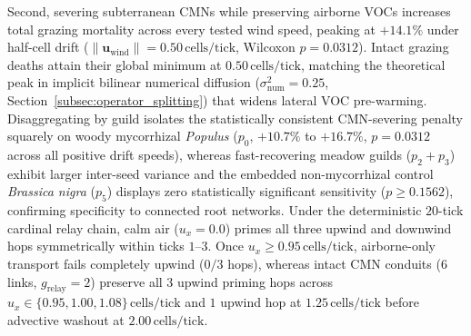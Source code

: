 Second, severing subterranean CMNs while preserving airborne VOCs increases total grazing mortality across every tested wind speed, peaking at $+14.1\%$ under half-cell drift ($\|\mathbf{u}_{\text{wind}}\| = 0.50\,\text{cells/tick}$, Wilcoxon $p = 0.0312$). Intact grazing deaths attain their global minimum at $0.50\,\text{cells/tick}$, matching the theoretical peak in implicit bilinear numerical diffusion ($\sigma_{\text{num}}^2 = 0.25$, Section~\ref{subsec:operator_splitting}) that widens lateral VOC pre-warming. Disaggregating by guild isolates the statistically consistent CMN-severing penalty squarely on woody mycorrhizal \textit{Populus} ($p_0$, $+10.7\%$ to $+16.7\%$, $p = 0.0312$ across all positive drift speeds), whereas fast-recovering meadow guilds ($p_2 + p_3$) exhibit larger inter-seed variance and the embedded non-mycorrhizal control \textit{Brassica nigra} ($p_5$) displays zero statistically significant sensitivity ($p \ge 0.1562$), confirming specificity to connected root networks. Under the deterministic $20$-tick cardinal relay chain, calm air ($u_x = 0.0$) primes all three upwind and downwind hops symmetrically within ticks $1\text{--}3$. Once $u_x \ge 0.95\,\text{cells/tick}$, airborne-only transport fails completely upwind ($0/3$ hops), whereas intact CMN conduits ($6$ links, $g_{\mathrm{relay}} = 2$) preserve all $3$ upwind priming hops across $u_x \in \{0.95, 1.00, 1.08\}\,\text{cells/tick}$ and $1$ upwind hop at $1.25\,\text{cells/tick}$ before advective washout at $2.00\,\text{cells/tick}$.


